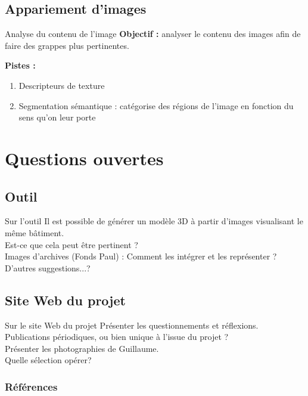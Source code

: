 \documentclass[10pt]{beamer}
\begin{document}
\subsection{Appariement d'images}
\begin{frame}{Analyse du contenu de l'image}
  \textbf{Objectif :} analyser le contenu des images afin de faire des grappes plus pertinentes.

  \textbf{Pistes :}
  \begin{enumerate}
  \item Descripteurs de texture
  \item Segmentation sémantique : catégorise des régions de l'image en fonction du sens qu'on leur porte
  \end{enumerate}

\end{frame}

\section{Questions ouvertes}
\subsection{Outil}
\begin{frame}{Sur l'outil}
  Il est possible de générer un modèle 3D à partir d'images visualisant le même bâtiment. \\
  \alert{Est-ce que cela peut être pertinent ?} \\[1cm]

  Images d'archives (Fonds Paul) :
  \alert{Comment les intégrer et les représenter ?}\\[1cm]
  
  \alert{D'autres suggestions...?}
\end{frame}

\subsection{Site Web du projet}
\begin{frame}{Sur le site Web du projet}
  Présenter les questionnements et réflexions. \\
  \alert{Publications périodiques, ou bien unique à l'issue du projet ?} \\[1cm]

  Présenter les photographies de Guillaume. \\
  \alert{Quelle sélection opérer?}
\end{frame}

 \begin{frame}[allowframebreaks]
  \frametitle{Références}
  
   \scriptsize{
     
   }
 \end{frame}

 
\end{document}
